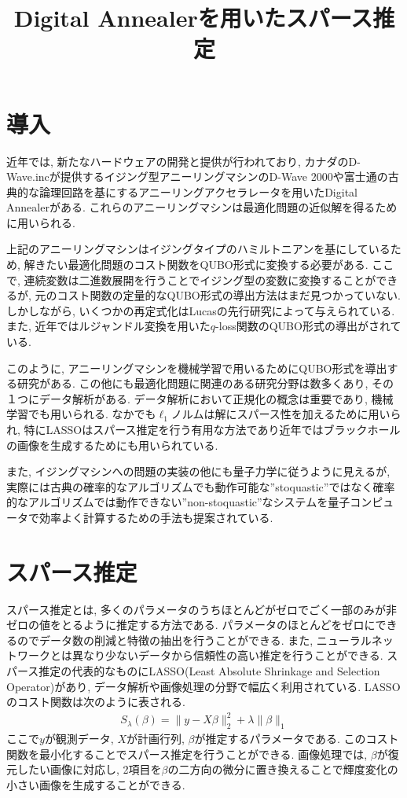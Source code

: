 \documentclass{jarticle}
\title{
Digital Annealerを用いたスパース推定
}
\begin{document}
\maketitle

\section{導入}
近年では, 新たなハードウェアの開発と提供が行われており, カナダのD-Wave.incが提供するイジング型アニーリングマシンのD-Wave 2000\cite{d-wave01, d-wave02}や富士通の古典的な論理回路を基にするアニーリングアクセラレータを用いたDigital Annealerがある. これらのアニーリングマシンは最適化問題の近似解を得るために用いられる.

上記のアニーリングマシンはイジングタイプのハミルトニアンを基にしているため, 解きたい最適化問題のコスト関数をQUBO形式に変換する必要がある. ここで, 連続変数は二進数展開を行うことでイジング型の変数に変換することができるが, 元のコスト関数の定量的なQUBO形式の導出方法はまだ見つかっていない. しかしながら, いくつかの再定式化はLucasの先行研究によって与えられている\cite{NP_problem}. また, 近年ではルジャンドル変換を用いた$q$-loss関数のQUBO形式の導出\cite{bib:q-loss}がされている.

このように, アニーリングマシンを機械学習で用いるためにQUBO形式を導出する研究がある. この他にも最適化問題に関連のある研究分野は数多くあり, その１つにデータ解析がある. データ解析において正規化の概念は重要であり, 機械学習でも用いられる. なかでも$\ell_{1}$ノルムは解にスパース性を加えるために用いられ, 特にLASSOはスパース推定を行う有用な方法であり近年ではブラックホールの画像を生成するためにも用いられている\cite{black_hole}.

また, イジングマシンへの問題の実装の他にも量子力学に従うように見えるが, 実際には古典の確率的なアルゴリズムでも動作可能な''stoquastic''ではなく確率的なアルゴリズムでは動作できない''non-stoquastic''なシステムを量子コンピュータで効率よく計算するための手法も提案されている.

\section{スパース推定}
スパース推定とは, 多くのパラメータのうちほとんどがゼロでごく一部のみが非ゼロの値をとるように推定する方法である. パラメータのほとんどをゼロにできるのでデータ数の削減と特徴の抽出を行うことができる. また, ニューラルネットワークとは異なり少ないデータから信頼性の高い推定を行うことができる. スパース推定の代表的なものにLASSO(Least Absolute Shrinkage and Selection Operator)があり, データ解析や画像処理の分野で幅広く利用されている. LASSOのコスト関数は次のように表される.
\begin{eqnarray}
  S_{\lambda}(\beta)=\|y-X\beta\|^{2}_{2}+\lambda\|\beta\|_{1}
\end{eqnarray}
ここで$y$が観測データ, $X$が計画行列, $\beta$が推定するパラメータである. このコスト関数を最小化することでスパース推定を行うことができる. 画像処理では, $\beta$が復元したい画像に対応し, 2項目を$\beta$の二方向の微分に置き換えることで輝度変化の小さい画像を生成することができる.
\end{document}
